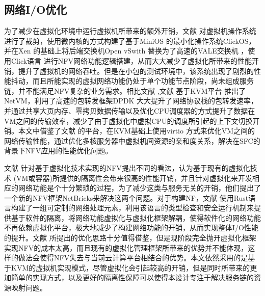 \subsection{网络I/O优化}
为了减少在虚拟化环境中运行虚拟机所带来的额外开销，文献  对虚拟机操作系统进行了裁剪，使用微内核的方式构建了基于MiniOS  的最小化操作系统ClickOS，并在Xen  的基础上将后端交换机Open vSwith  替换为了高速的VALE交换机  ，使用Click语言  进行NFV网络功能逻辑搭建，从而大大减少了虚拟化所带来的性能开销，提升了虚拟机的网络吞吐。但是在小包的测试环境中，该系统出现了剧烈的性能抖动，而且所能实现的虚拟网络功能仍处于单个功能节点阶段，尚未组成服务链，并不能满足NFV复杂的业务需求。相比文献  ,文献  基于KVM平台  推出了NetVM，利用了高速的包转发框架DPDK  大大提升了网络协议栈的包转发速率，并通过共享大页内存、零拷贝数据传输以及优化CPU调度器的方式提升了数据在VM之间的传输效率，减少了由于虚拟化中虚拟CPU的调度所引起的上下文切换开销。本文中借鉴了文献  的平台，在KVM基础上使用virtio  方式来优化VM之间的网络传输性能，通过优化多核服务器中虚拟机间资源的亲和度关系，解决在SFC的背景下NFV应用的性能优化问题。

文献  针对基于虚拟化技术实现的NFV提出不同的看法，认为基于现有的虚拟化技术 (VM或容器)所提供的隔离性会带来很高的性能开销，并且针对虚拟化来开发相应的网络功能是个十分繁琐的过程，为了减少这类与服务无关的开销，他们提出了一个新的NFV框架NetBricks来解决这两个问题。对于构建NF，文献  使用Rust语言构建了一组可定制的网络处理元素，利用该语言的类型检查和安全运行机制来提供基于软件的隔离，将网络功能虚拟化与虚拟化框架解耦，使得软件化的网络功能不再依赖虚拟化平台，极大地减少了构建网络功能的开销，从而实现整体I/O性能的提升。文献  所提出的优化思路十分值得借鉴，但是现阶段完全抛开虚拟化框架实现NFV的成本太高，而且现有的虚拟化管理框架所带来的优势并不能体现，这样的做法会使得NFV失去与当前云计算平台相结合的优势。本文依然采用的是基于KVM的虚拟机实现模式，尽管虚拟化会引起较高的开销，但是同时所带来的更加简单的实现方式，以及更好的隔离性保障可以使得本设计专注于解决服务链的资源映射问题。



